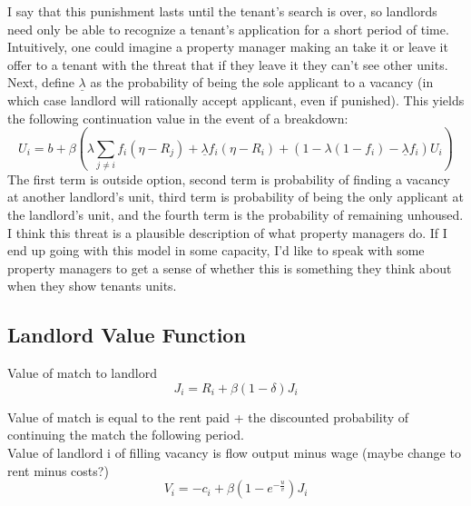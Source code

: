  I say that this punishment lasts until the tenant's search is over, so landlords need only be able to recognize a tenant's application for a short period of time. Intuitively, one could imagine a property manager making an take it or leave it offer to a tenant with the threat that if they leave it they can't see other units. \\

 Next, define \textbf{$\underline{\lambda}$} as the probability of being the sole applicant to a vacancy (in which case landlord will rationally accept applicant, even if punished). This yields the following continuation value in the event of a breakdown:\\

        \begin{equation}\label{eq:match-val}
            U_i = b + \beta \left(\lambda\sum_{j\neq i}f_i(\eta - R_j) + \underline{\lambda} f_i(\eta - R_i) + (1-\lambda(1-f_i) - \underline{\lambda} f_i)U_i\right)
        \end{equation}
The first term is outside option, second term is probability of finding a vacancy at another landlord's unit, third term is probability of being the only applicant at the landlord's unit, and the fourth term is the probability of remaining unhoused.\\

I think this threat is a plausible description of what property managers do. If I end up going with this model in some capacity, I'd like to speak with some property managers to get a sense of whether this is something they think about when they show tenants units.

\subsection{Landlord Value Function}
Value of match to landlord \begin{equation}
        J_i = R_i + \beta(1 - \delta)J_i
    \end{equation}\label{eq:landlord-val}

 Value of match is equal to the rent paid + the discounted probability of continuing the match the following period.\\ 

    Value of landlord i of filling vacancy is flow output minus wage (maybe change to rent minus costs?)
    \begin{equation}\label{eq:job-value}
        V_i = -c_i + \beta(1  - e^{-\frac{u}{v}})J_i
    \end{equation}

